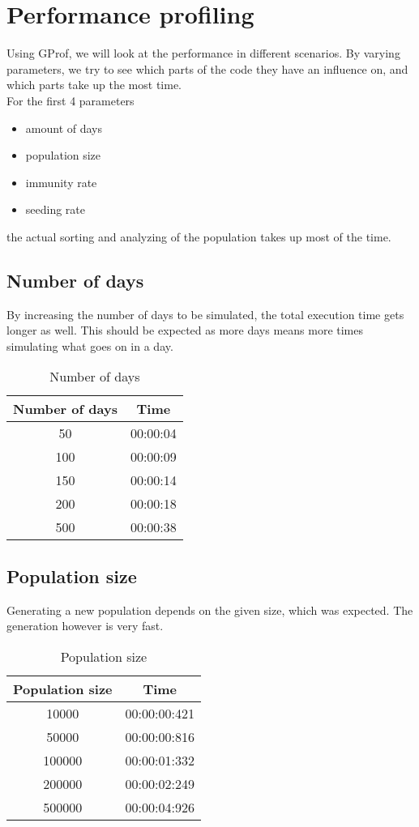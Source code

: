 \documentclass{article}
\begin{document}
\section{Performance profiling}
Using GProf, we will look at the performance in different scenarios. By varying parameters, we try to see which parts of the code they have an influence on, and which parts take up the most time. 
\\
For the first 4 parameters
\begin{itemize}
	\item amount of days
	\item population size
	\item immunity rate
	\item seeding rate
\end{itemize}
the actual sorting and analyzing of the population takes up most of the time.

\subsection{Number of days}
By increasing the number of days to be simulated, the total execution time gets longer as well. This should be expected as more days means more times simulating what goes on in a day.
\begin{table}[!h]
	\centering
	\begin{tabular}{|c|c|}
		\hline
		Number of days & Time \\\hline
		50  & 00:00:04 \\\hline
    	100 & 00:00:09 \\\hline
    	150 & 00:00:14 \\\hline
    	200	& 00:00:18 \\\hline
    	500 & 00:00:38 \\
    	\hline
	\end{tabular}
	\caption{Number of days}
\end{table}

\subsection{Population size}
Generating a new population depends on the given size, which was expected. The generation however is very fast.
\begin{table}[!h]
	\centering
	\begin{tabular}{|c|c|}
		\hline
		Population size & Time \\\hline
	    10000  & 00:00:00:421 \\\hline
	    50000  & 00:00:00:816 \\\hline
	    100000 & 00:00:01:332 \\\hline
 	    200000 & 00:00:02:249 \\\hline
 	    500000 & 00:00:04:926 \\
    	\hline
	\end{tabular}
	\caption{Population size}
\end{table}
\end{document}
